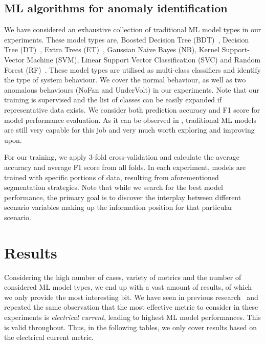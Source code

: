\subsection{ML algorithms for anomaly identification}
We have considered an exhaustive collection of traditional ML model types in our experiments. These model types are, Boosted Decision Tree (BDT)~\cite{Friedman:2001:BDT}, Decision Tree (DT)~\cite{Breiman:1984:DT}, Extra Trees (ET)~\cite{Geurts:2006:ET}, Gaussian Naive Bayes (NB), Kernel Support-Vector Machine (SVM), Linear Support Vector Classification (SVC) and Random Forest (RF)~\cite{Breiman:2001:RF}. These model types are utilised as multi-class classifiers and identify the type of system behaviour. We cover the normal behaviour, as well as two anomalous behaviours (NoFan and UnderVolt) in our experiments. Note that our training is supervised and the list of classes can be easily expanded if representative data exists. We consider both prediction accuracy and F1 score for model performance evaluation. As it can be observed in , traditional ML models are still very capable for this job and very much worth exploring and improving upon.

For our training, we apply 3-fold cross-validation and calculate the average accuracy and average F1 score from all folds. In each experiment, models are trained with specific portions of data, resulting from aforementioned segmentation strategies. Note that while we search for the best model performance, the primary goal is to discover the interplay between different scenario variables making up the information position for that particular scenario.

\section{Results}
\label{sec:results}
Considering the high number of cases, variety of metrics and the number of considered ML model types, we end up with a vast amount of results, of which we only provide the most interesting bit. We have seen in previous research~\cite{Odyurt:2021:PPFT} and repeated the same observation that the most effective metric to consider in these experiments is \emph{electrical current}, leading to highest ML model performances. This is valid throughout. Thus, in the following tables, we only cover results based on the electrical current metric.

